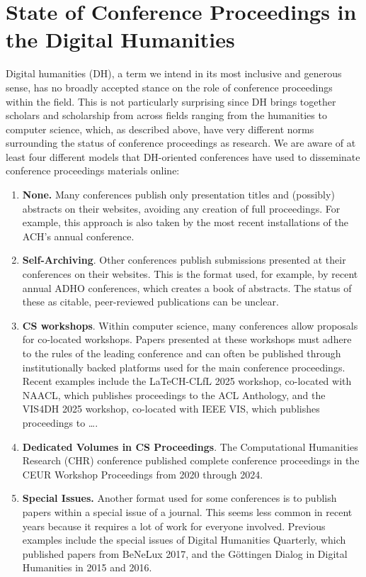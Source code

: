 \documentclass[final]{anthology-ch} %
\begin{document}
\section{State of Conference Proceedings in the Digital Humanities}

Digital humanities (DH), a term we intend in its most inclusive and
generous sense, has no broadly accepted stance on the role of conference
proceedings within the field. This is not particularly surprising since
DH brings together scholars and scholarship from across fields ranging
from the humanities to computer science, which, as described above, have
very different norms surrounding the status of conference proceedings as
research. We are aware of at least four different models that
DH-oriented conferences have used to disseminate conference proceedings
materials online:

\begin{enumerate}
\def\labelenumi{\arabic{enumi}.}
\item
  \textbf{None.} Many conferences publish only presentation titles and
  (possibly) abstracts on their websites, avoiding any creation of full
  proceedings. For example, this approach is also taken by the most
  recent installations of the ACH's annual conference.
\item
  \textbf{Self-Archiving}. Other conferences publish submissions
  presented at their conferences on their websites. This is the format
  used, for example, by recent annual ADHO conferences, which creates a
  book of abstracts. The status of these as citable, peer-reviewed
  publications can be unclear.
\item
  \textbf{CS workshops}. Within computer science, many conferences allow
  proposals for co-located workshops. Papers presented at these
  workshops must adhere to the rules of the leading conference and can
  often be published through institutionally backed platforms used for
  the main conference proceedings. Recent examples include the
  LaTeCH-CLfL 2025 workshop, co-located with NAACL, which publishes
  proceedings to the ACL Anthology, and the VIS4DH 2025 workshop,
  co-located with IEEE VIS, which publishes proceedings to \ldots.
\item
  \textbf{Dedicated Volumes in CS Proceedings}. The Computational
  Humanities Research (CHR) conference published complete conference
  proceedings in the CEUR Workshop Proceedings from 2020 through 2024.
\item
  \textbf{Special Issues.} Another format used for some conferences is
  to publish papers within a special issue of a journal. This seems less
  common in recent years because it requires a lot of work for everyone
  involved. Previous examples include the special issues of Digital
  Humanities Quarterly, which published papers from BeNeLux 2017, and
  the Göttingen Dialog in Digital Humanities in 2015 and 2016.
\end{enumerate}
\end{document}
